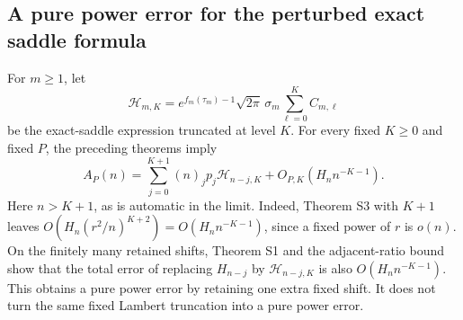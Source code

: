 \subsection{A pure power error for the perturbed exact saddle formula}
For $m\ge1$, let
\[
\mathcal H_{m,K}=e^{f_m(\tau_m)-1}\sqrt{2\pi}\,\sigma_m
                   \sum_{\ell=0}^{K}C_{m,\ell}
\]
be the exact-saddle expression truncated at level $K$. For every fixed
$K\ge0$ and fixed $P$, the preceding theorems imply
\[
A_P(n)=\sum_{j=0}^{K+1}(n)_jp_j\mathcal H_{n-j,K}
       +O_{P,K}(H_n n^{-K-1}).
\]
Here $n>K+1$, as is automatic in the limit. Indeed, Theorem S3 with
$K+1$ leaves $O(H_n(r^2/n)^{K+2})=O(H_nn^{-K-1})$, since a fixed
power of $r$ is $o(n)$. On the finitely many retained shifts, Theorem S1
and the adjacent-ratio bound show that the total error of replacing
$H_{n-j}$ by $\mathcal H_{n-j,K}$ is also $O(H_nn^{-K-1})$.
This obtains a pure power error by retaining one extra fixed shift. It
does not turn the same fixed Lambert truncation into a pure power error.
